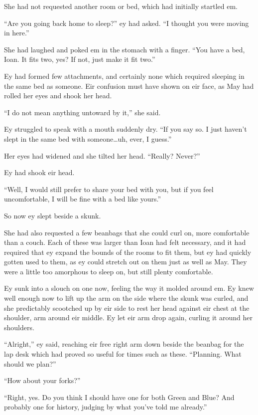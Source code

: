 She had not requested another room or bed, which had initially startled em.

``Are you going back home to sleep?'' ey had asked. ``I thought you were moving in here.''

She had laughed and poked em in the stomach with a finger. ``You have a bed, Ioan. It fits two, yes? If not, just make it fit two.''

Ey had formed few attachments, and certainly none which required sleeping in the same bed as someone. Eir confusion must have shown on eir face, as May had rolled her eyes and shook her head.

``I do not mean anything untoward by it,'' she said.

Ey struggled to speak with a mouth suddenly dry. ``If you say so. I just haven't slept in the same bed with someone\ldots uh, ever, I guess.''

Her eyes had widened and she tilted her head. ``Really? Never?''

Ey had shook eir head.

``Well, I would still prefer to share your bed with you, but if you feel uncomfortable, I will be fine with a bed like yours.''

So now ey slept beside a skunk.

She had also requested a few beanbags that she could curl on, more comfortable than a couch. Each of these was larger than Ioan had felt necessary, and it had required that ey expand the bounds of the rooms to fit them, but ey had quickly gotten used to them, as ey could stretch out on them just as well as May. They were a little too amorphous to sleep on, but still plenty comfortable.

Ey sunk into a slouch on one now, feeling the way it molded around em. Ey knew well enough now to lift up the arm on the side where the skunk was curled, and she predictably scootched up by eir side to rest her head against eir chest at the shoulder, arm around eir middle. Ey let eir arm drop again, curling it around her shoulders.

``Alright,'' ey said, reaching eir free right arm down beside the beanbag for the lap desk which had proved so useful for times such as these. ``Planning. What should we plan?''

``How about your forks?''

``Right, yes. Do you think I should have one for both Green and Blue? And probably one for history, judging by what you've told me already.''

